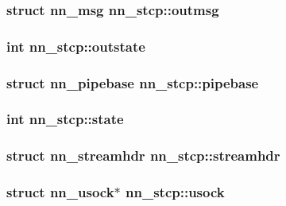 \subsubsection[{outmsg}]{\setlength{\rightskip}{0pt plus 5cm}struct {\bf nn\+\_\+msg} nn\+\_\+stcp\+::outmsg}\hypertarget{structnn__stcp_a52236d63d9223804caf4af2fc4f71031}{}\label{structnn__stcp_a52236d63d9223804caf4af2fc4f71031}
\subsubsection[{outstate}]{\setlength{\rightskip}{0pt plus 5cm}int nn\+\_\+stcp\+::outstate}\hypertarget{structnn__stcp_ac616d48e415897b1878472eb3082ebe0}{}\label{structnn__stcp_ac616d48e415897b1878472eb3082ebe0}
\subsubsection[{pipebase}]{\setlength{\rightskip}{0pt plus 5cm}struct {\bf nn\+\_\+pipebase} nn\+\_\+stcp\+::pipebase}\hypertarget{structnn__stcp_a1304b5f2b79734de08ab7a8a0d31798d}{}\label{structnn__stcp_a1304b5f2b79734de08ab7a8a0d31798d}
\subsubsection[{state}]{\setlength{\rightskip}{0pt plus 5cm}int nn\+\_\+stcp\+::state}\hypertarget{structnn__stcp_afba37d373a3ba23254bea9e094d1ad62}{}\label{structnn__stcp_afba37d373a3ba23254bea9e094d1ad62}
\subsubsection[{streamhdr}]{\setlength{\rightskip}{0pt plus 5cm}struct {\bf nn\+\_\+streamhdr} nn\+\_\+stcp\+::streamhdr}\hypertarget{structnn__stcp_a83d9f7a873f7e82006bfb888aab05c9f}{}\label{structnn__stcp_a83d9f7a873f7e82006bfb888aab05c9f}
\subsubsection[{usock}]{\setlength{\rightskip}{0pt plus 5cm}struct {\bf nn\+\_\+usock}$\ast$ nn\+\_\+stcp\+::usock}\hypertarget{structnn__stcp_a76f77fd461d033a021244ef1b9f79b40}{}\label{structnn__stcp_a76f77fd461d033a021244ef1b9f79b40}
